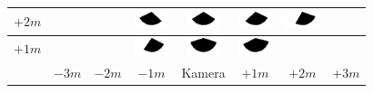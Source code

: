 \begin{tabular}{|c|c|c|c|c|c|c|c|}
	\hline 
	$+2m$ & & &
	\includegraphics[width=1cm]{img_Bereich/V1_vid_res_Winkel_X_-1000_2000.png}&
	\includegraphics[width=1cm]{img_Bereich/V1_vid_res_Winkel_X_0_2000.png}&
	\includegraphics[width=1cm]{img_Bereich/V1_vid_res_Winkel_X_1000_2000.png}&
	\includegraphics[width=1cm]{img_Bereich/V1_vid_res_Winkel_X_2000_2000.png}&\\ 
	\hline 
	$+1m$ & & &
	\includegraphics[width=1cm]{img_Bereich/V1_vid_res_Winkel_X_-1000_1000.png}&
	\includegraphics[width=1cm]{img_Bereich/V1_vid_res_Winkel_X_0_1000.png}&
	\includegraphics[width=1cm]{img_Bereich/V1_vid_res_Winkel_X_1000_1000.png}& &\\ 
	\hline 
	& $-3m$ & $-2m$ & $-1m$ &Kamera& $+1m$ & $+2m$ & $+3m$ \\ 
	\hline 
\end{tabular}